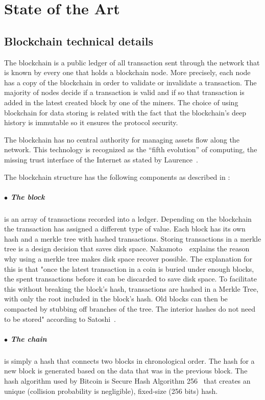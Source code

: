 \chapter{State of the Art}
\label{chapter:chapter2}

\section{Blockchain technical details}
\label{sec:chapter2-section1}
The blockchain is a public ledger of all transaction sent through the network that is known by every one that holds a blockchain node. More precisely, each node has a copy of the blockchain in order to validate or invalidate a transaction. The majority of nodes decide if a transaction is valid and if so that transaction is added in the latest created block by one of the miners. The choice of using blockchain for data storing is related with the fact that the blockchain’s deep history is immutable so it ensures the protocol security.

The blockchain has no central authority for managing assets flow along the network. This technology is recognized as the “fifth evolution” of computing, the missing trust interface of the Internet as stated by Laurence~\cite{blockchaind}.

The blockchain structure has the following components as described in :
\paragraph{$\bullet$ The block}is an array of transactions recorded into a ledger. Depending on the blockchain the transaction has assigned a different type of value.
Each block has its own hash and a merkle tree with hashed transactions. Storing transactions in a merkle tree is a design decision that saves disk space. Nakamoto~\cite{bitcoinwhitepaper}\ explains the reason why using a merkle tree makes disk space recover possible. The explanation for this is that "once the latest transaction in a coin is buried under enough blocks, the spent transactions before it can be discarded to save disk space. To facilitate this without breaking the block’s hash, transactions are hashed in a Merkle Tree, with only the root included in the block’s hash. Old blocks can then be compacted by stubbing off branches of the tree. The interior hashes do not need to be stored" according to Satoshi~\cite{bitcoinwhitepaper}.
\paragraph{$\bullet$ The chain}is simply a hash that connects two blocks in chronological order. The hash for a new block is generated based on the data that was in the previous block. The hash algorithm used by Bitcoin is Secure Hash Algorithm 256~\cite{sha2} that creates an unique (collision probability is negligible), fixed-size (256 bits) hash. 
